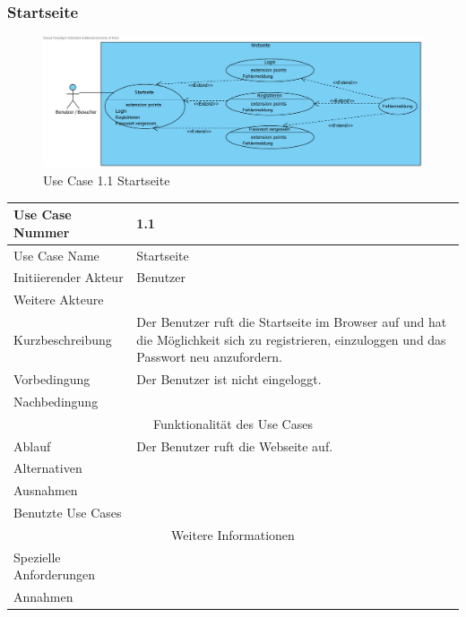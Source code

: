 \documentclass[10pt,a4paper]{article}
\begin{document}
\subsubsection{Startseite}
	\begin{figure}[H]
	  \includegraphics[width=\linewidth]{gfx/webseite/startseite.pdf}
          \caption{Use Case 1.1 Startseite}
	\end{figure}
	\begin{tabularx}{\textwidth}{|l|X|}
	\hline Use Case Nummer & 1.1 \\ 
	\hline Use Case Name & Startseite \\ 
	\hline Initiierender Akteur & Benutzer \\
	\hline Weitere Akteure &  \\
	\hline Kurzbeschreibung & Der Benutzer ruft die Startseite im Browser auf und hat die M\"oglichkeit sich zu registrieren, einzuloggen und das Passwort neu anzufordern. \\
	\hline Vorbedingung & Der Benutzer ist nicht eingeloggt. \\
	\hline Nachbedingung &  \\
	\hline \multicolumn{2}{|c|}{Funktionalität des Use Cases}\\
	\hline Ablauf & Der Benutzer ruft die Webseite auf. \\
	\hline Alternativen &  \\
	\hline Ausnahmen &  \\
	\hline Benutzte Use Cases &  \\
	\hline \multicolumn{2}{|c|}{Weitere Informationen} \\
	\hline Spezielle Anforderungen &  \\
	\hline Annahmen &  \\
	\hline
	\end{tabularx} 
\end{document}
